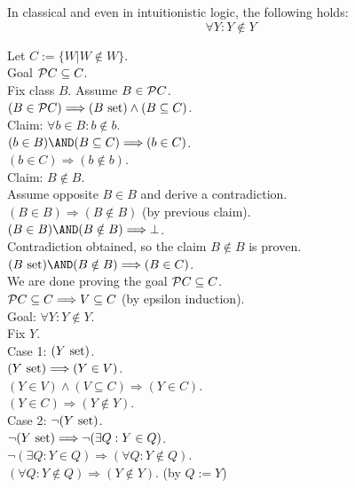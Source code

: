 \begin{theorem}
\label{thm:not in itself}
In classical and even in intuitionistic logic, the following holds:
\[ \forall Y: Y\notin Y\]
\end{theorem}
\Proof
\noindent %
Let $C:=\{W|W\notin W\}$.\\
Goal $\mathcal{P} C\subseteq C$.\\
Fix class $B$. Assume $B\in \mathcal{P} C$.\\
$(B\in \mathcal{P} C) \Longrightarrow (B\mathrm{\ set})\land(B\subseteq C)$.\\
Claim: $\forall b\in B:b\notin b$.\\ %
$(b\in B)\AND(B\subseteq C) \Longrightarrow (b\in C)$.\\
$(b\in C) \Longrightarrow (b\notin b)$.\\
Claim: $B\notin B$.\\
Assume opposite $B\in B$ and derive a contradiction.\\
$(B\in B) \Longrightarrow (B\notin B)$ (by previous claim).\\
$(B\in B)\AND(B\notin B) \Longrightarrow \bot$.\\
Contradiction obtained, so the claim  $B\notin B$ is proven.\\
$(B\set)\AND(B\notin B) \Longrightarrow (B\in C)$.\\
We are done proving the goal $\mathcal{P} C\subseteq C$.\\
$\mathcal{P} C\subseteq C \Longrightarrow V\subseteq C$ (by epsilon induction).\\
Goal: $ \forall Y: Y\notin Y$.\\
Fix $Y$.\\
Case 1: $(Y\mathrm{\ set})$.\\
$(Y\mathrm{\ set})\Longrightarrow (Y\in V)$.\\
$(Y\in V)\land (V\subseteq C) \Longrightarrow (Y\in C)$.\\
$(Y\in C)\Longrightarrow (Y\notin Y)$.\\
Case 2: $\neg(Y\mathrm{\ set})$.\\
$\neg(Y\mathrm{\ set}) \Longrightarrow \neg(\exists Q:Y\in Q)$.\\
$\neg(\exists Q:Y\in Q)  \Longrightarrow (\forall Q:Y\notin Q)$.\\
$(\forall Q:Y\notin Q) \Longrightarrow (Y\notin Y)$. (by $Q:=Y$)\\
\Done

